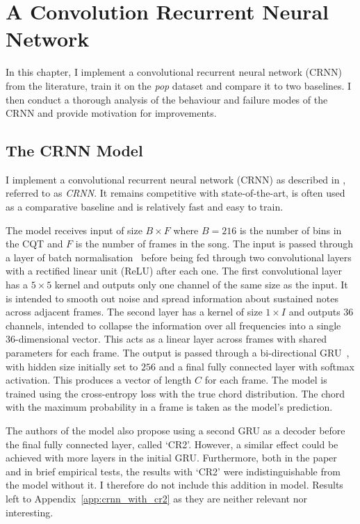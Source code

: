 \chapter{A Convolution Recurrent Neural Network}\label{chap:crnn}

In this chapter, I implement a convolutional recurrent neural network (CRNN) from the literature, train it on the \emph{pop} dataset and compare it to two baselines. I then conduct a thorough analysis of the behaviour and failure modes of the CRNN and provide motivation for improvements. 

\section{The CRNN Model}\label{sec:crnn}

I implement a convolutional recurrent neural network (CRNN) as described in \citet{StructuredTraining}, referred to as \emph{CRNN}. It remains competitive with state-of-the-art, is often used as a comparative baseline and is relatively fast and easy to train.

The model receives input of size $B \times F$ where $B=216$ is the number of bins in the CQT and $F$ is the number of frames in the song. The input is passed through a layer of batch normalisation~\citep{BatchNorm} before being fed through two convolutional layers with a rectified linear unit (ReLU) after each one. The first convolutional layer has a $5\times 5$ kernel and outputs only one channel of the same size as the input. It is intended to smooth out noise and spread information about sustained notes across adjacent frames. The second layer has a kernel of size $1\times I$ and outputs 36 channels, intended to collapse the information over all frequencies into a single 36-dimensional vector. This acts as a linear layer across frames with shared parameters for each frame. The output is passed through a bi-directional GRU~\citep{GRU}, with hidden size initially set to $256$ and a final fully connected layer with softmax activation. This produces a vector of length $C$ for each frame. The model is trained using the cross-entropy loss with the true chord distribution. The chord with the maximum probability in a frame is taken as the model's prediction.

The authors of the model also propose using a second GRU as a decoder before the final fully connected layer, called `CR2'. However, a similar effect could be achieved with more layers in the initial GRU. Furthermore, both in the paper and in brief empirical tests, the results with `CR2' were indistinguishable from the model without it. I therefore do not include this addition in model. Results left to Appendix~\ref{app:crnn_with_cr2} as they are neither relevant nor interesting.

